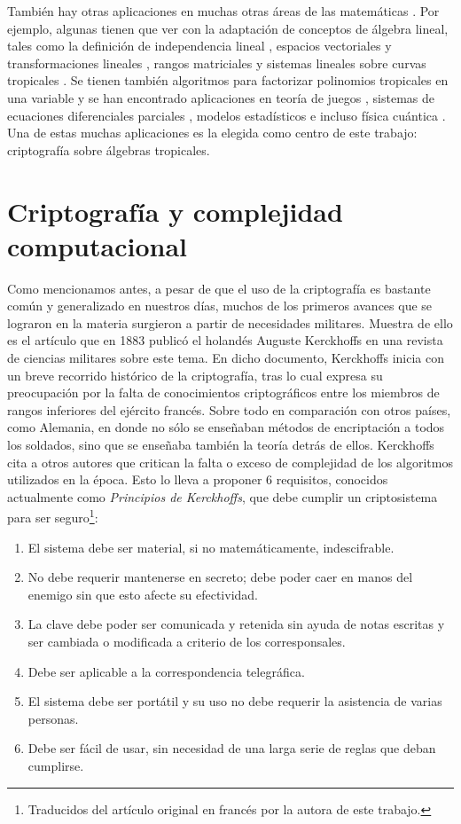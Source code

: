 \bigskip También hay otras aplicaciones en muchas otras áreas de las matemáticas \cite{app}. Por ejemplo, algunas tienen que ver con la adaptación de conceptos de álgebra lineal, tales como la definición de independencia lineal \cite{lind}, espacios vectoriales \cite{mik} y transformaciones lineales \cite{puente}, rangos matriciales \cite{rank} y sistemas lineales sobre curvas tropicales \cite{tropicurv}. Se tienen también algoritmos para factorizar polinomios tropicales en una variable \cite{fund} y se han encontrado aplicaciones en teoría de juegos \cite{juegos}, sistemas de ecuaciones diferenciales parciales \cite{pde}, modelos estadísticos \cite{stat} e incluso física cuántica \cite{dequant}. Una de estas muchas aplicaciones es la elegida como centro de este trabajo: criptografía sobre álgebras tropicales.

\section{Criptografía y complejidad computacional}

\noindent Como mencionamos antes, a pesar de que el uso de la criptografía es bastante común y generalizado en nuestros días, muchos de los primeros avances que se lograron en la materia surgieron a partir de necesidades militares. Muestra de ello es el artículo \cite{kerck} que en 1883 publicó el holandés Auguste Kerckhoffs en una revista de ciencias militares sobre este tema. En dicho documento, Kerckhoffs inicia con un breve recorrido histórico de la criptografía, tras lo cual expresa su preocupación por la falta de conocimientos criptográficos entre los miembros de rangos inferiores del ejército francés. Sobre todo en comparación con otros países, como Alemania, en donde no sólo se enseñaban métodos de encriptación a todos los soldados, sino que se enseñaba también la teoría detrás de ellos. Kerckhoffs cita a otros autores que critican la falta o exceso de complejidad de los algoritmos utilizados en la época. Esto lo lleva a proponer 6 requisitos, conocidos actualmente como \textit{Principios de Kerckhoffs}, que debe cumplir un criptosistema para ser seguro\footnote{Traducidos del artículo original \cite{kerck} en francés por la autora de este trabajo.}:
{\small 
\begin{enumerate}
\item El sistema debe ser material, si no matemáticamente, indescifrable.
\item No debe requerir mantenerse en secreto; debe poder caer en manos del enemigo sin que esto afecte su efectividad.
\item La clave debe poder ser comunicada y retenida sin ayuda de notas escritas y ser cambiada o modificada a criterio de los corresponsales.
\item Debe ser aplicable a la correspondencia telegráfica.
\item El sistema debe ser portátil y su uso no debe requerir la asistencia de varias personas.
\item Debe ser fácil de usar, sin necesidad de una larga serie de reglas que deban cumplirse.
\end{enumerate}}

